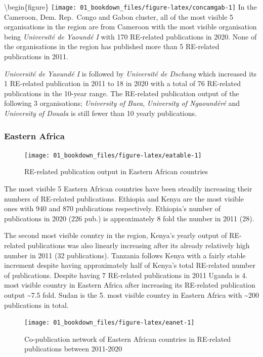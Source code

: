 \documentclass[
]{book}
\begin{document}
\textbackslash begin\{figure\}
\texttt{[image: 01\_bookdown\_files/figure-latex/concamgab-1]}
In the Cameroon, Dem. Rep.~Congo and Gabon cluster, all of the most visible 5 organisations in the region are from Cameroon with the most visible organisation being \emph{Université de Yaoundé I} with 170 RE-related publications in 2020. None of the organisations in the region has published more than 5 RE-related publications in 2011.

\emph{Université de Yaoundé I} is followed by \emph{Université de Dschang} which increased its 1 RE-related publication in 2011 to 18 in 2020 with a total of 76 RE-related publications in the 10-year range. The RE-related publication output of the following 3 organisations; \emph{University of Buea}, \emph{University of Ngaoundéré} and \emph{University of Douala} is still fewer than 10 yearly publications.

\hypertarget{eastern-africa}{%
\subsubsection{Eastern Africa}\label{eastern-africa}}

\begin{figure}
\texttt{[image: 01\_bookdown\_files/figure-latex/eatable-1]} \caption{RE-related publication output in Eastern African countries}\label{fig:eatable}
\end{figure}

The most visible 5 Eastern African countries have been steadily increasing their numbers of RE-related publications. Ethiopia and Kenya are the most visible ones with 940 and 870 publications respectively. Ethiopia's number of publications in 2020 (226 pub.) is approximately 8 fold the number in 2011 (28).

The second most visible country in the region, Kenya's yearly output of RE-related publications was also linearly increasing after its already relatively high number in 2011 (32 publications). Tanzania follows Kenya with a fairly stable increment despite having approximately half of Kenya's total RE-related number of publications. Despite having 7 RE-related publications in 2011 Uganda is 4. most visible country in Eastern Africa after increasing its RE-related publication output \textasciitilde7.5 fold. Sudan is the 5. most visible country in Eastern Africa with \textasciitilde200 publications in total.

\begin{figure}
\texttt{[image: 01\_bookdown\_files/figure-latex/eanet-1]} \caption{Co-publication network of Eastern African countries in RE-related publications between 2011-2020}\label{fig:eanet}
\end{figure}
\end{document}
